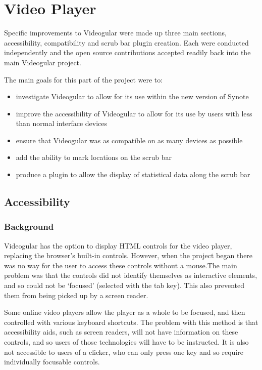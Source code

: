 \chapter{Video Player} 
\label{Chapter:Video Player}

Specific improvements to \gls{Videogular} were made up three main sections, accessibility, compatibility and scrub bar plugin creation. Each were conducted independently and the open source contributions accepted readily back into the main \gls{Videogular} project.

The main goals for this part of the project were to:
\begin{itemize}
\item investigate \gls{Videogular} to allow for its use within the new version of Synote
\item improve the accessibility of \gls{Videogular} to allow for its use by users with less than normal interface  devices
\item ensure that \gls{Videogular} was as compatible on as many devices as possible
\item add the ability to mark locations on the scrub bar
\item produce a plugin to allow the display of statistical data along the scrub bar
\end{itemize}


\section{Accessibility} 
\label{Section:Accessibility}

\subsection{Background} 
\gls{Videogular} has the option to display HTML controls for the video player, replacing the browser's built-in controls. However, when the project began there was no way for the user to access these controls without a mouse.The main problem was that the controls did not identify themselves as interactive elements, and so could not be `focused' (selected with the tab key). This also prevented them from being picked up by a screen reader.

Some online video players allow the player as a whole to be focused, and then controlled with various keyboard shortcuts. The problem with this method is that accessibility aids, such as screen readers, will not have information on these controls, and so users of those technologies will have to be instructed. It is also not accessible to users of a clicker, who can only press one key and so require individually focusable controls.

